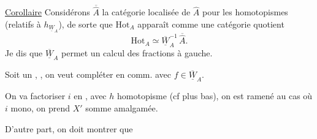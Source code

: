 
\uline{Corollaire} Considérons $\overline{\widehat A}$ la catégorie localisée de
$\widehat A$ pour les homotopismes (relatifs à $h_{\underline W_A}$), de sorte que
$\mathrm{Hot}_A$ apparaît comme une catégorie quotient
\[
\mathrm{Hot}_A\simeq\overline{\underline W}_A^{-1}\,\overline{\widehat A}.
\]
Je dis que $\overline{\underline W}_A$ permet un calcul des fractions à gauche.

 Soit un 
, , on veut compléter en
comm. avec $f\in\overline{\underline W}_A$.

On va factoriser  $i$ en 
, avec $h$ homotopisme
(cf plus bas), on est ramené au cas où $i$ \deleted{$\unsure{\Longrightarrow}$} mono,
on prend $X'$ somme amalgamée.

D'autre part, on doit montrer que
